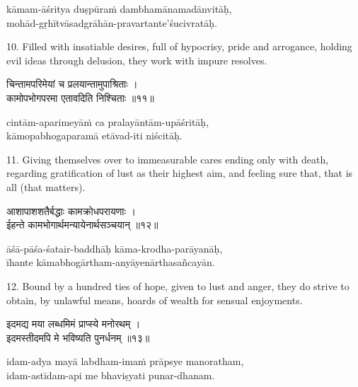 \begin{transliteration}
kāmam-āśritya duṣpūraṁ dambhamānamadānvitāḥ, \\
mohād-gṛhītvāsadgrāhān-pravartante'śucivratāḥ.
\end{transliteration}

10. Filled with insatiable desires, full of hypocrisy, pride and arrogance,
holding evil ideas through delusion, they work with impure resolves.

\begin{gitaverse}
चिन्तामपरिमेयां च प्रलयान्तामुपाश्रिताः । \\
कामोपभोगपरमा एतावदिति निश्चिताः ॥११॥
\end{gitaverse}

\begin{transliteration}
cintām-aparimeyāṁ ca pralayāntām-upāśritāḥ, \\
kāmopabhogaparamā etāvad-iti niścitāḥ.
\end{transliteration}

11. Giving themselves over to immeasurable cares ending only with death,
regarding gratification of lust as their highest aim, and feeling sure that,
that is all (that matters).

\begin{gitaverse}
आशापाशशतैर्बद्धाः कामक्रोधपरायणाः । \\
ईहन्ते कामभोगार्थमन्यायेनार्थसञ्चयान् ॥१२॥
\end{gitaverse}

\begin{transliteration}
āśā-pāśa-śatair-baddhāḥ kāma-krodha-parāyanāḥ, \\
īhante kāmabhogārtham-anyāyenārthasañcayān.
\end{transliteration}

12. Bound by a hundred ties of hope, given to lust and anger, they do strive to
obtain, by unlawful means, hoards of wealth for sensual enjoyments.

\begin{gitaverse}
इदमद्य मया लब्धमिमं प्राप्स्ये मनोरथम् । \\
इदमस्तीदमपि मे भविष्यति पुनर्धनम् ॥१३॥
\end{gitaverse}

\begin{transliteration}
idam-adya mayā labdham-imaṁ prāpsye manoratham, \\
idam-astīdam-api me bhaviṣyati punar-dhanam.
\end{transliteration}

